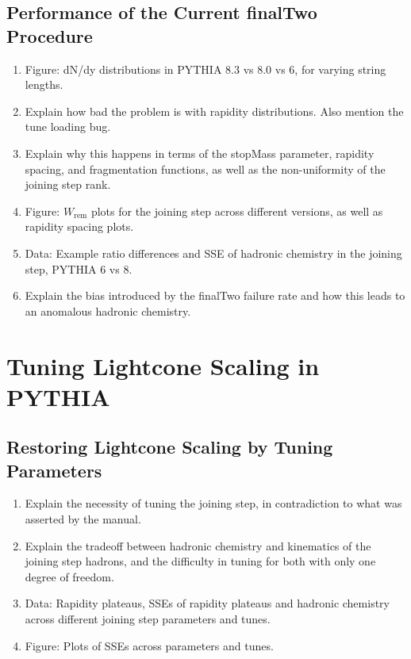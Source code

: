 \documentclass[12pt,a4paper]{report}
\begin{document}
\section{Performance of the Current finalTwo Procedure}
\begin{enumerate}
\item Figure: dN/dy distributions in PYTHIA 8.3 vs 8.0 vs 6, for varying string lengths.
\item Explain how bad the problem is with rapidity distributions. Also mention the tune loading bug.
\item Explain why this happens in terms of the stopMass parameter, rapidity spacing, and fragmentation functions, as well as the non-uniformity of the joining step rank.
\item Figure: $W_\text{rem}$ plots for the joining step across different versions, as well as rapidity spacing plots.
\item Data: Example ratio differences and SSE of hadronic chemistry in the joining step, PYTHIA 6 vs 8.
\item Explain the bias introduced by the finalTwo failure rate and how this leads to an anomalous hadronic chemistry.
\end{enumerate}

\chapter{Tuning Lightcone Scaling in PYTHIA}
\label{chap:tuning}
\section{Restoring Lightcone Scaling by Tuning Parameters}
\begin{enumerate}
\item Explain the necessity of tuning the joining step, in contradiction to what was asserted by the manual.
\item Explain the tradeoff between hadronic chemistry and kinematics of the joining step hadrons, and the difficulty in tuning for both with only one degree of freedom.
\item Data: Rapidity plateaus, SSEs of rapidity plateaus and hadronic chemistry across different joining step parameters and tunes.
\item Figure: Plots of SSEs across parameters and tunes.
\end{enumerate}
\end{document}
